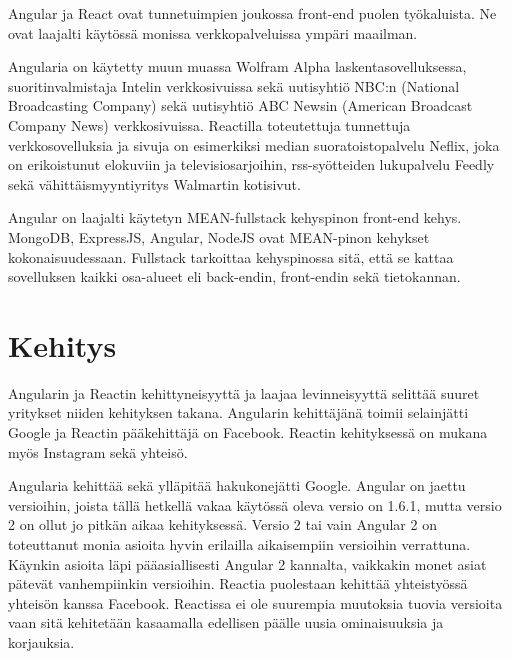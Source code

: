 \documentclass[a4paper,12pt,twoside]{article} %
\begin{document}
\vspace{4mm}\noindent Angular ja React ovat tunnetuimpien joukossa front-end puolen työkaluista. Ne ovat laajalti käytössä monissa verkkopalveluissa ympäri maailman.

\vspace{4mm}\noindent Angularia on käytetty muun muassa Wolfram Alpha laskentasovelluksessa\cite{angularlist}, suoritinvalmistaja Intelin verkkosivuissa sekä uutisyhtiö NBC:n (National Broadcasting Company) sekä uutisyhtiö ABC Newsin (American Broadcast Company News) verkkosivuissa.\cite{angularwikipedia} Reactilla toteutettuja tunnettuja verkkosovelluksia ja sivuja on esimerkiksi median suoratoistopalvelu Neflix, joka on erikoistunut elokuviin ja televisiosarjoihin, rss-syötteiden lukupalvelu Feedly sekä vähittäismyyntiyritys Walmartin kotisivut. \cite{reactlist}

\vspace{4mm}\noindent Angular on laajalti käytetyn MEAN-fullstack kehyspinon front-end kehys. MongoDB, ExpressJS, Angular, NodeJS ovat MEAN-pinon kehykset kokonaisuudessaan. Fullstack tarkoittaa kehyspinossa sitä, että se kattaa sovelluksen kaikki osa-alueet eli back-endin, front-endin sekä tietokannan.

\newpage


\section{Kehitys}

Angularin ja Reactin kehittyneisyyttä ja laajaa levinneisyyttä selittää suuret yritykset niiden kehityksen takana. Angularin kehittäjänä toimii selainjätti Google ja Reactin pääkehittäjä on Facebook. Reactin kehityksessä on mukana myös Instagram sekä yhteisö.

\vspace{4mm}\noindent Angularia kehittää sekä ylläpitää hakukonejätti Google. Angular on jaettu versioihin, joista tällä hetkellä vakaa käytössä oleva versio on 1.6.1, mutta versio 2 on ollut jo pitkän aikaa kehityksessä. Versio 2 tai vain Angular 2 on toteuttanut monia asioita hyvin erilailla aikaisempiin versioihin verrattuna. Käynkin asioita läpi pääasiallisesti Angular 2 kannalta, vaikkakin monet asiat pätevät vanhempiinkin versioihin. Reactia puolestaan kehittää yhteistyössä yhteisön kanssa Facebook. Reactissa ei ole suurempia muutoksia tuovia versioita vaan sitä kehitetään kasaamalla edellisen päälle uusia ominaisuuksia ja korjauksia.

\vspace{4mm}\noindent
\end{document}
